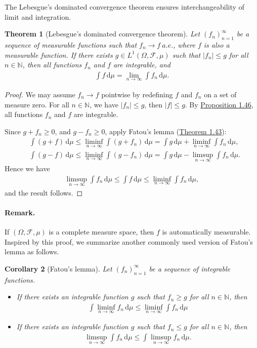 \documentclass{article}
\numberwithin{equation}{section}
\renewcommand{\d}{\mathrm{d}}
\theoremstyle{plain}
\newtheorem{theorem}{Theorem}[section]
\newtheorem{corollary}[theorem]{Corollary}
\theoremstyle{definition}
\begin{document}
The Lebesgue's dominated convergence theorem ensures interchangeability of limit and integration.

\begin{theorem}[Lebesgue's dominated convergence theorem]\label{thm:1.47} Let $(f_n)_{n=1}^\infty$ be a sequence of measurable functions such that $f_n\to f\ a.e.$, where $f$ is also a measurable function. If there exists $g\in L^1(\Omega,\mathscr{F},\mu)$ such that $\vert f_n\vert\leq g$ for all $n\in\mathbb{N}$, then all functions $f_n$ and $f$ are integrable, and
\begin{align*}
	\int f\,\d \mu = \lim_{n\to\infty}\int f_n\,\d \mu.
\end{align*}
\end{theorem}
\begin{proof}
We may assume $f_n\to f$ pointwise by redefining $f$ and $f_n$ on a set of measure zero. For all $n\in\mathbb{N}$, we have $\vert f_n\vert\leq g$, then $\vert f\vert\leq g$. By \hyperref[prop:1.46]{Proposition 1.46}, all functions $f_n$ and $f$ are integrable.

Since $g+f_n\geq 0$, and $g-f_n\geq 0$, apply Fatou's lemma (\hyperref[thm:1.43]{Theorem 1.43}):
\begin{align*}
	&\int (g+f)\,\d \mu \leq \liminf_{n\to\infty}\int (g+f_n)\,\d \mu = \int g\,\d \mu + \liminf_{n\to\infty}\int f_n\,\d \mu,\\
	&\int (g-f)\,\d \mu \leq \liminf_{n\to\infty}\int (g-f_n)\,\d \mu = \int g\,\d \mu - \limsup_{n\to\infty}\int f_n\,\d \mu.
\end{align*}
Hence we have
\begin{align*}
	\limsup_{n\to\infty}\int f_n\,\d \mu\leq\int f\,\d \mu\leq \liminf_{n\to\infty}\int f_n\,\d \mu,
\end{align*}
and the result follows.
\end{proof}
\paragraph{Remark.} If $(\Omega,\mathscr{F},\mu)$ is a complete measure space, then $f$ is automatically measurable. Inspired by this proof, we summarize another commonly used version of Fatou's lemma as follows.

\begin{corollary}[Fatou's lemma]\label{cor:1.48} Let $(f_n)_{n=1}^\infty$ be a sequence of integrable functions.
\begin{itemize}
\item[(i)] If there exists an integrable function $g$ such that $f_n\geq g$ for all $n\in\mathbb{N}$, then
\begin{align*}
	\int\liminf_{n\to\infty} f_n\,\d \mu \leq \liminf_{n\to\infty}\int f_n\,\d \mu
\end{align*}
\item[(ii)] If there exists an integrable function $g$ such that $f_n\leq g$ for all $n\in\mathbb{N}$, then
\begin{align*}
	 \limsup_{n\to\infty}\int f_n\,\d \mu\leq\int\limsup_{n\to\infty} f_n\,\d \mu.
\end{align*}
\end{itemize}
\end{corollary}
\end{document}
